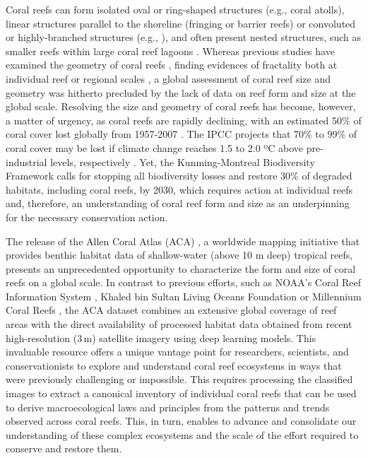 Coral reefs can form isolated oval or ring-shaped structures (e.g., coral
atolls), linear structures parallel to the shoreline (fringing or barrier
reefs) or convoluted or highly-branched structures (e.g., \cite{Purkis2007}),
and often present nested structures, such as smaller reefs within large coral
reef lagoons \cite{Bradbury1983}. Whereas previous studies have examined the
geometry of coral reefs \cite{Bradbury1983,Purkis2007,
    Zawada2009,Alvarez_Filip2009,Bozec2015, Sous2020}, finding evidences of
fractality both at individual reef \cite{Bradbury1983,Sous2020} or regional
scales \cite{Purkis2007, Zawada2009}, a global assessment of coral reef size
and geometry was hitherto precluded by the lack of data on reef form and size
at the global scale. Resolving the size and geometry of coral reefs has become,
however, a matter of urgency, as coral reefs are rapidly declining, with an
estimated 50\% of coral cover lost globally from 1957-2007
\cite{eddy2021global}. The IPCC projects that 70\% to 99\% of coral cover may
be lost if climate change reaches 1.5 to 2.0 ºC above pre-industrial levels,
respectively \cite{bindoff2019changing}. Yet, the Kunming-Montreal Biodiversity
Framework \cite{kunming-montreal-framework} calls for stopping all biodiversity
losses and restore 30\% of degraded habitats, including coral reefs, by 2030,
which requires action at individual reefs and, therefore, an understanding of
coral reef form and size as an underpinning for the necessary conservation
action.

The release of the Allen Coral Atlas (ACA) \cite{allen-coral-atlas}, a
worldwide mapping initiative that provides benthic habitat data of
shallow-water (above 10 m deep) tropical reefs, presents an unprecedented
opportunity to characterize the form and size of coral reefs on a global scale.
In contrast to previous efforts, such as NOAA’s Coral Reef Information System
\cite{oconnor2020}, Khaled bin Sultan Living Oceans Foundation
\cite{globalreefexpedition2021} or Millennium Coral Reefs \cite{unep2010}, the
ACA dataset combines an extensive global coverage of reef areas with the direct
availability of processed habitat data obtained from recent high-resolution
(3\,m) satellite imagery using deep learning models. This invaluable resource
offers a unique vantage point for researchers, scientists, and conservationists
to explore and understand coral reef ecosystems in ways that were previously
challenging or impossible. This requires processing the classified images to
extract a canonical inventory of individual coral reefs that can be used to
derive macroecological laws and principles from the patterns and trends
observed across coral reefs. This, in turn, enables to advance and consolidate
our understanding of these complex ecosystems and the scale of the effort
required to conserve and restore them.

